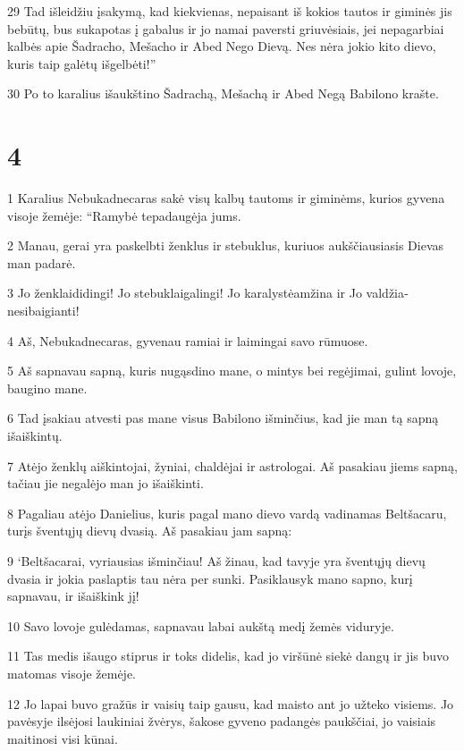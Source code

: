 \par 29 Tad išleidžiu įsakymą, kad kiekvienas, nepaisant iš kokios tautos ir giminės jis bebūtų, bus sukapotas į gabalus ir jo namai paversti griuvėsiais, jei nepagarbiai kalbės apie Šadracho, Mešacho ir Abed Nego Dievą. Nes nėra jokio kito dievo, kuris taip galėtų išgelbėti!” 
\par 30 Po to karalius išaukštino Šadrachą, Mešachą ir Abed Negą Babilono krašte.



\chapter{4}


\par 1 Karalius Nebukadnecaras sakė visų kalbų tautoms ir giminėms, kurios gyvena visoje žemėje: “Ramybė tepadaugėja jums. 
\par 2 Manau, gerai yra paskelbti ženklus ir stebuklus, kuriuos aukščiausiasis Dievas man padarė. 
\par 3 Jo ženklai­didingi! Jo stebuklai­galingi! Jo karalystė­amžina ir Jo valdžia­nesibaigianti! 
\par 4 Aš, Nebukadnecaras, gyvenau ramiai ir laimingai savo rūmuose. 
\par 5 Aš sapnavau sapną, kuris nugąsdino mane, o mintys bei regėjimai, gulint lovoje, baugino mane. 
\par 6 Tad įsakiau atvesti pas mane visus Babilono išminčius, kad jie man tą sapną išaiškintų. 
\par 7 Atėjo ženklų aiškintojai, žyniai, chaldėjai ir astrologai. Aš pasakiau jiems sapną, tačiau jie negalėjo man jo išaiškinti. 
\par 8 Pagaliau atėjo Danielius, kuris pagal mano dievo vardą vadinamas Beltšacaru, turįs šventųjų dievų dvasią. Aš pasakiau jam sapną: 
\par 9 ‘Beltšacarai, vyriausias išminčiau! Aš žinau, kad tavyje yra šventųjų dievų dvasia ir jokia paslaptis tau nėra per sunki. Pasiklausyk mano sapno, kurį sapnavau, ir išaiškink jį! 
\par 10 Savo lovoje gulėdamas, sapnavau labai aukštą medį žemės viduryje. 
\par 11 Tas medis išaugo stiprus ir toks didelis, kad jo viršūnė siekė dangų ir jis buvo matomas visoje žemėje. 
\par 12 Jo lapai buvo gražūs ir vaisių taip gausu, kad maisto ant jo užteko visiems. Jo pavėsyje ilsėjosi laukiniai žvėrys, šakose gyveno padangės paukščiai, jo vaisiais maitinosi visi kūnai. 
